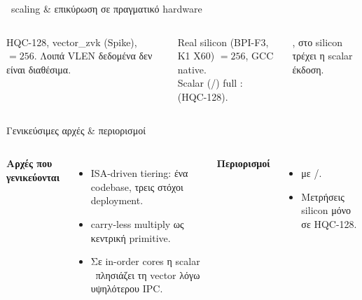 \documentclass[aspectratio=169,10pt]{beamer}
\begin{document}
\begin{frame}{\VLEN\ scaling \& επικύρωση σε πραγματικό hardware}
  \begin{columns}[T]
      \par\footnotesize\textcolor{neutral}{HQC-128, vector\_zvk (Spike), \VLEN$=256$. Λοιπά VLEN δεδομένα δεν είναι διαθέσιμα.}
      \begin{block}{Real silicon (BPI-F3, K1 X60)}
        \VLEN $=256$, GCC native.\\[0.3em]
        Scalar (\Zbc/\Zbb) full \KEM:\\  (HQC-128).
      \end{block}
      \footnotesize {}, στο silicon τρέχει η scalar έκδοση.
  \end{columns}
\end{frame}


\begin{frame}{Γενικεύσιμες αρχές \& περιορισμοί}
  \begin{columns}[T]
      \textbf{Αρχές που γενικεύονται}
      \begin{itemize}
        \item ISA-driven tiering: ένα codebase, τρεις στόχοι deployment.
        \item carry-less multiply ως κεντρική primitive.
        \item Σε in-order cores η scalar \Zbc\ πλησιάζει τη vector λόγω υψηλότερου IPC.
      \end{itemize}
      \textbf{Περιορισμοί}
      \begin{itemize}
        \item {} με \Zvbc/\Zvbb.
        \item Μετρήσεις silicon μόνο σε HQC-128.
      \end{itemize}
  \end{columns}
\end{frame}
\end{document}
